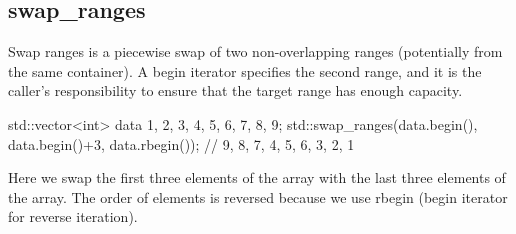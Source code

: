 \subsection{swap\_ranges}

Swap ranges is a piecewise swap of two non-overlapping ranges (potentially from the same container). A begin iterator specifies the second range, and it is the caller’s responsibility to ensure that the target range has enough capacity.


\begin{box-note}
\begin{cppcode}
std::vector<int> data{ 1, 2, 3, 4, 5, 6, 7, 8, 9};
std::swap_ranges(data.begin(), data.begin()+3, data.rbegin());
// 9, 8, 7, 4, 5, 6, 3, 2, 1
\end{cppcode}
\end{box-note}

Here we swap the first three elements of the array with the last three elements of the array. The order of elements is reversed because we use rbegin (begin iterator for reverse iteration).